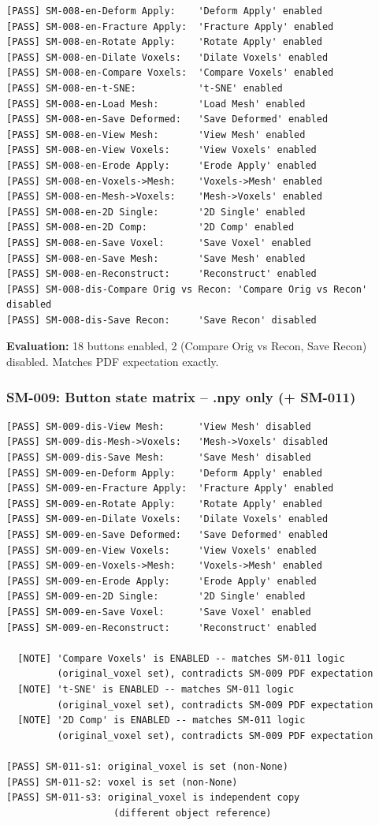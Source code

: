 \documentclass[12pt,a4paper]{article}
\begin{document}
\begin{lstlisting}
[PASS] SM-008-en-Deform Apply:    'Deform Apply' enabled
[PASS] SM-008-en-Fracture Apply:  'Fracture Apply' enabled
[PASS] SM-008-en-Rotate Apply:    'Rotate Apply' enabled
[PASS] SM-008-en-Dilate Voxels:   'Dilate Voxels' enabled
[PASS] SM-008-en-Compare Voxels:  'Compare Voxels' enabled
[PASS] SM-008-en-t-SNE:           't-SNE' enabled
[PASS] SM-008-en-Load Mesh:       'Load Mesh' enabled
[PASS] SM-008-en-Save Deformed:   'Save Deformed' enabled
[PASS] SM-008-en-View Mesh:       'View Mesh' enabled
[PASS] SM-008-en-View Voxels:     'View Voxels' enabled
[PASS] SM-008-en-Erode Apply:     'Erode Apply' enabled
[PASS] SM-008-en-Voxels->Mesh:    'Voxels->Mesh' enabled
[PASS] SM-008-en-Mesh->Voxels:    'Mesh->Voxels' enabled
[PASS] SM-008-en-2D Single:       '2D Single' enabled
[PASS] SM-008-en-2D Comp:         '2D Comp' enabled
[PASS] SM-008-en-Save Voxel:      'Save Voxel' enabled
[PASS] SM-008-en-Save Mesh:       'Save Mesh' enabled
[PASS] SM-008-en-Reconstruct:     'Reconstruct' enabled
[PASS] SM-008-dis-Compare Orig vs Recon: 'Compare Orig vs Recon' disabled
[PASS] SM-008-dis-Save Recon:     'Save Recon' disabled
\end{lstlisting}

\textbf{Evaluation:} 18 buttons enabled, 2 (Compare Orig vs Recon, Save Recon)
disabled. Matches PDF expectation exactly.

\subsubsection{SM-009: Button state matrix -- .npy only (+ SM-011)}

\begin{lstlisting}
[PASS] SM-009-dis-View Mesh:      'View Mesh' disabled
[PASS] SM-009-dis-Mesh->Voxels:   'Mesh->Voxels' disabled
[PASS] SM-009-dis-Save Mesh:      'Save Mesh' disabled
[PASS] SM-009-en-Deform Apply:    'Deform Apply' enabled
[PASS] SM-009-en-Fracture Apply:  'Fracture Apply' enabled
[PASS] SM-009-en-Rotate Apply:    'Rotate Apply' enabled
[PASS] SM-009-en-Dilate Voxels:   'Dilate Voxels' enabled
[PASS] SM-009-en-Save Deformed:   'Save Deformed' enabled
[PASS] SM-009-en-View Voxels:     'View Voxels' enabled
[PASS] SM-009-en-Voxels->Mesh:    'Voxels->Mesh' enabled
[PASS] SM-009-en-Erode Apply:     'Erode Apply' enabled
[PASS] SM-009-en-2D Single:       '2D Single' enabled
[PASS] SM-009-en-Save Voxel:      'Save Voxel' enabled
[PASS] SM-009-en-Reconstruct:     'Reconstruct' enabled

  [NOTE] 'Compare Voxels' is ENABLED -- matches SM-011 logic
         (original_voxel set), contradicts SM-009 PDF expectation
  [NOTE] 't-SNE' is ENABLED -- matches SM-011 logic
         (original_voxel set), contradicts SM-009 PDF expectation
  [NOTE] '2D Comp' is ENABLED -- matches SM-011 logic
         (original_voxel set), contradicts SM-009 PDF expectation

[PASS] SM-011-s1: original_voxel is set (non-None)
[PASS] SM-011-s2: voxel is set (non-None)
[PASS] SM-011-s3: original_voxel is independent copy
                   (different object reference)
\end{lstlisting}
\end{document}
